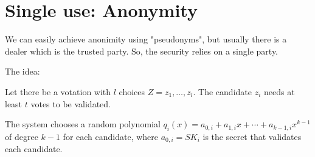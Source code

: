\chapter{Single use: Anonymity}
\label{chap:single}
We can easily achieve anonimity using "pseudonyms", but usually there is a dealer which is the trusted party. So, the security relies on a single party.

The idea:

Let there be a votation with $l$ choices $Z ={z_1, \dots, z_l}$. The candidate $z_i$ needs at least $t$ votes to be validated.

The system chooses a random polynomial $q_i(x) = a_{0,i} + a_{1,i} x + \cdots + a_{k-1 , i}  x ^{k-1}$ of degree $k-1$ for each candidate, where $a_{0,i} = SK_i$ is the secret that validates each candidate.
